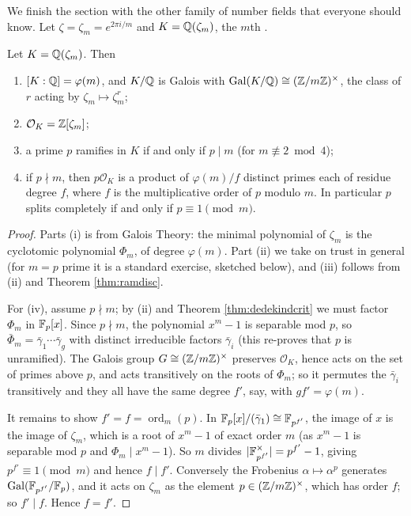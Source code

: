 \documentclass[a4paper]{scrartcl}
\renewcommand{\OO}{\mathcal{O}}
\newcommand{\Gal}{\operatorname{Gal}}
\begin{document}
We finish the section with the other family of number fields that everyone should know. Let $\zeta = \zeta_m = e^{2\pi i/m}$ and $K = \mathbb{Q}(\zeta_m)$, the $m$th .

\begin{proposition}\label{prop:cyclo}
	Let $K = \mathbb{Q}(\zeta_m)$. Then
	\begin{enumerate}[label=(\roman*)]
		\item $[K:\mathbb{Q}] = \varphi(m)$, and $K/\mathbb{Q}$ is Galois with $\Gal(K/\Q) \cong (\Z/m\Z)^\times$, the class of $r$ acting by $\zeta_m \mapsto \zeta_m^r$;
		\item $\OO_K = \Z[\zeta_m]$;
		\item a prime $p$ ramifies in $K$ if and only if $p \mid m$ (for $m \not\equiv 2 \bmod 4$);
		\item if $p \nmid m$, then $p\OO_K$ is a product of $\varphi(m)/f$ distinct primes each of residue degree $f$, where $f$ is the multiplicative order of $p$ modulo $m$. In particular $p$ splits completely if and only if $p \equiv 1 \pmod m$.
	\end{enumerate}
\end{proposition}

\begin{proof}
	Parts (i) is from Galois Theory: the minimal polynomial of $\zeta_m$ is the cyclotomic polynomial $\Phi_m$, of degree $\varphi(m)$. Part (ii) we take on trust in general (for $m = p$ prime it is a standard exercise, sketched below), and (iii) follows from (ii) and Theorem \ref{thm:ramdisc}.

	For (iv), assume $p \nmid m$; by (ii) and Theorem \ref{thm:dedekindcrit} we must factor $\Phi_m$ in $\mathbb{F}_p[x]$. Since $p\nmid m$, the polynomial $x^m - 1$ is separable mod $p$, so $\bar\Phi_m = \bar\gamma_1\cdots\bar\gamma_g$ with distinct irreducible factors $\bar\gamma_i$ (this re-proves that $p$ is unramified). The Galois group $G \cong (\mathbb{Z}/m\mathbb{Z})^\times$ preserves $\OO_K$, hence acts on the set of primes above $p$, and acts transitively on the roots of $\Phi_m$; so it permutes the $\bar\gamma_i$ transitively and they all have the same degree $f'$, say, with $gf' = \varphi(m)$.

	It remains to show $f' = f = \operatorname{ord}_m(p)$. In $\mathbb{F}_p[x]/(\bar\gamma_1) \cong \mathbb{F}_{p^{f'}}$, the image of $x$ is the image of $\zeta_m$, which is a root of $x^m-1$ of exact order $m$ (as $x^m-1$ is separable mod $p$ and $\Phi_m \mid x^m-1$). So $m$ divides $\lvert\mathbb{F}_{p^{f'}}^\times\rvert = p^{f'}-1$, giving $p^{f'} \equiv 1 \pmod m$ and hence $f \mid f'$. Conversely the Frobenius $\alpha\mapsto\alpha^p$ generates $\Gal(\F_{p^{f'}}/\F_p)$, and it acts on $\zeta_m$ as the element $p \in (\mathbb{Z}/m\mathbb{Z})^\times$, which has order $f$; so $f' \mid f$. Hence $f = f'$.
\end{proof}
\end{document}
